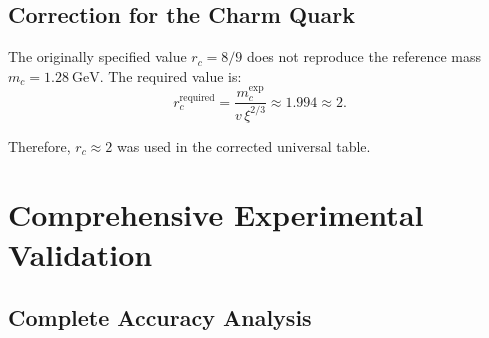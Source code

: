 	\begin{table}[H]
		\centering
		\caption{Yukawa predictions with corrected $r_i,p_i$ and comparison with reference masses.}
		\label{tab:quark_yukawa_predictions}
	\end{table}
	
	\subsection{Correction for the Charm Quark}
	\label{subsec:charm_correction}
	
	The originally specified value $r_c=8/9$ does not reproduce the reference mass $m_c=1.28\ \mathrm{GeV}$. The required value is:
	\[
	r_c^{\text{required}}=\frac{m_c^{\text{exp}}}{v\,\xi^{2/3}}\approx 1.994 \approx 2.
	\]
	
	Therefore, $r_c \approx 2$ was used in the corrected universal table.
	
	\section{Comprehensive Experimental Validation}
	\label{sec:comprehensive_validation}
	
	\subsection{Complete Accuracy Analysis}
	\label{subsec:complete_accuracy}
	
